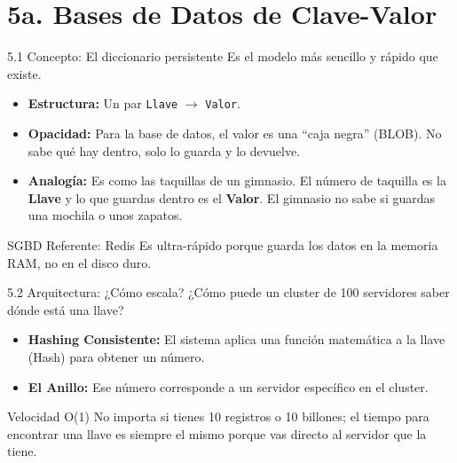 \section{5a. Bases de Datos de Clave-Valor}

\begin{frame}{5.1 Concepto: El diccionario persistente}
    Es el modelo más sencillo y rápido que existe.
    \begin{itemize}
        \item \textbf{Estructura:} Un par \texttt{Llave} $\rightarrow$ \texttt{Valor}.
        \item \textbf{Opacidad:} Para la base de datos, el valor es una ``caja negra'' (BLOB). No sabe qué hay dentro, solo lo guarda y lo devuelve.
        \item \textbf{Analogía:} Es como las taquillas de un gimnasio. El número de taquilla es la \textbf{Llave} y lo que guardas dentro es el \textbf{Valor}. El gimnasio no sabe si guardas una mochila o unos zapatos.
    \end{itemize}
    \begin{exampleblock}{SGBD Referente: Redis}
        Es ultra-rápido porque guarda los datos en la memoria RAM, no en el disco duro.
    \end{exampleblock}
\end{frame}

\begin{frame}{5.2 Arquitectura: ¿Cómo escala?}
    ¿Cómo puede un cluster de 100 servidores saber dónde está una llave?
    \begin{itemize}
        \item \textbf{Hashing Consistente:} El sistema aplica una función matemática a la llave (Hash) para obtener un número.
        \item \textbf{El Anillo:} Ese número corresponde a un servidor específico en el cluster.
    \end{itemize}
    \begin{alertblock}{Velocidad O(1)}
        No importa si tienes 10 registros o 10 billones; el tiempo para encontrar una llave es siempre el mismo porque vas directo al servidor que la tiene.
    \end{alertblock}
\end{frame}


